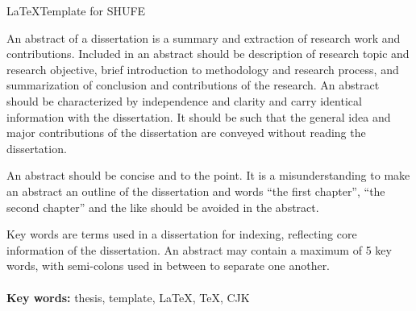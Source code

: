 \documentclass{SUFEThesis}
\begin{document}

\maketitle



\thispagestyle{empty}
\begin{center}
 \LaTeX Template for SHUFE
\end{center}

\begin{center}
\end{center}
 
\begin{adjustwidth}{1cm}{1cm}
\hspace{1.5em}
An abstract of a dissertation is a summary and extraction of research work
and contributions. Included in an abstract should be description of research
topic and research objective, brief introduction to methodology and research
process, and summarization of conclusion and contributions of the
research. An abstract should be characterized by independence and clarity and
carry identical information with the dissertation. It should be such that the
general idea and major contributions of the dissertation are conveyed without
reading the dissertation.

An abstract should be concise and to the point. It is a misunderstanding to
make an abstract an outline of the dissertation and words ``the first
chapter'', ``the second chapter'' and the like should be avoided in the
abstract.

Key words are terms used in a dissertation for indexing, reflecting core
information of the dissertation. An abstract may contain a maximum of 5 key
words, with semi-colons used in between to separate one another.\\
\\
\textbf{Key words:} thesis, template, \LaTeX, \TeX, CJK 
\end{adjustwidth}
\end{document}
